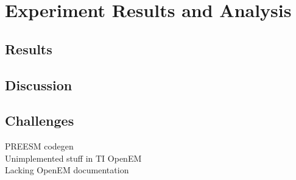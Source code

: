 \chapter{Experiment Results and Analysis}
\label{chapter:results-and-analysis}

\section{Results}
\label{sec:results}


\section{Discussion}
\label{sec:discussion}


\section{Challenges}
\label{sec:challenges}
PREESM codegen \\
Unimplemented stuff in TI OpenEM \\
Lacking OpenEM documentation

